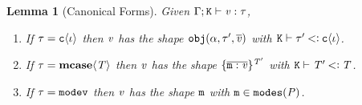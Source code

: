 \documentclass[onecolumn,nocopyrightspace]{sigplanconf}
\newtheorem{lemma}{Lemma}
\theoremstyle{lessintrusive}
\theoremstyle{plain}
\theoremstyle{custom}
\begin{document}
\begin{lemma}[Canonical Forms]
\label{pf:canonical-forms}
Given $\Gamma;\mathtt{K}\vdash\mathit{v}:\tau$,
\leavevmode
\begin{enumerate}[(\arabic*)] 

\item If $\tau = \mathtt{c}\langle\iota\rangle$ then $\mathit{v}$ has the shape $\mathtt{obj}(\alpha,\tau',\overline{\mathit{v}})$ with $\mathtt{K}\vdash\tau'\mathbin{<\vcentcolon}\mathtt{c}\langle\iota\rangle$.

\item If $\tau = \texttt{\bf mcase}\langle\mathit{T}\rangle$ then $\mathit{v}$ has the shape $\{\overline{\mathtt{m} : \mathit{v}}\}^{\mathit{T}'}$ with $\mathtt{K}\vdash\mathit{T}'\mathbin{<\vcentcolon}\mathit{T}$.

\item If $\tau = \mathtt{modev}$ then $\mathit{v}$ has the shape $\mathtt{m}$ with $\mathtt{m} \in \mathtt{modes}(\mathit{P})$.

\end{enumerate}
\end{lemma}
\end{document}
